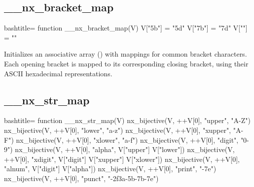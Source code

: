 \newpage
\subsection{__nx_bracket_map}
\label{__nx_bracket_map}
\begin{NexCodeBox}{bash}{title={}}
function __nx_bracket_map(V) {
	V["\x5b"] = "\x5d"
	V["\x7b"] = "\x7d"
	V[""] = ""
}
\end{NexCodeBox}

\begin{NexMainBox}
	\begin{NexMainBox}
		Initializes an associative array () with mappings for common bracket characters. Each opening bracket is mapped to its corresponding closing bracket, using their ASCII hexadecimal representations.
	\end{NexMainBox}
	\begin{NexMainBox}
		\begin{NexListDark}
		\end{NexListDark}
	\end{NexMainBox}
\end{NexMainBox}

\subsection{__nx_str_map}
\label{__nx_str_map}
\begin{NexCodeBox}{bash}{title={}}
function __nx_str_map(V)
{
	nx_bijective(V, ++V[0], "upper", "A-Z")
	nx_bijective(V, ++V[0], "lower", "a-z")
	nx_bijective(V, ++V[0], "xupper", "A-F")
	nx_bijective(V, ++V[0], "xlower", "a-f")
	nx_bijective(V, ++V[0], "digit", "0-9")
	nx_bijective(V, ++V[0], "alpha", V["upper"] V["lower"])
	nx_bijective(V, ++V[0], "xdigit", V["digit"] V["xupper"] V["xlower"])
	nx_bijective(V, ++V[0], "alnum", V["digit"] V["alpha"])
	nx_bijective(V, ++V[0], "print", "-\x7e")
	nx_bijective(V, ++V[0], "punct", "-\x2f\x3a-\x5b-\x7b-\x7e")
}
\end{NexCodeBox}

